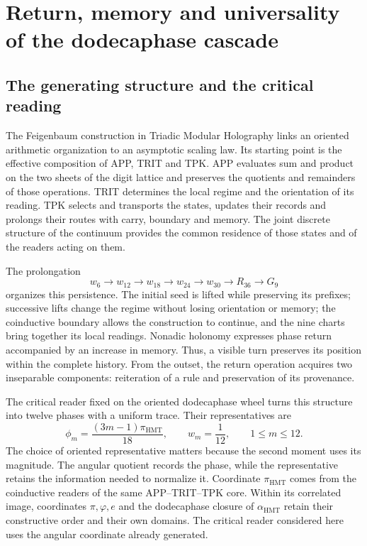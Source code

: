 \section{Return, memory and universality of the dodecaphase cascade}
\label{sec:hmt-feig-interpretacion}

\subsection{The generating structure and the critical reading}

The Feigenbaum construction in Triadic Modular Holography links an
oriented arithmetic organization to an asymptotic scaling law.
Its starting point is the effective composition of APP, TRIT and TPK. APP evaluates
sum and product on the two sheets of the digit lattice and preserves the
quotients and remainders of those operations. TRIT determines the local regime and
the orientation of its reading. TPK selects and transports the states,
updates their records and prolongs their routes with carry, boundary and memory.
The joint discrete structure of the continuum provides the common residence
of those states and of the readers acting on them.

The prolongation
\[
w_6\longrightarrow w_{12}\longrightarrow w_{18}
\longrightarrow w_{24}\longrightarrow w_{30}
\longrightarrow R_{36}\longrightarrow G_9
\]
organizes this persistence. The initial seed is lifted while preserving its
prefixes; successive lifts change the regime without losing orientation
or memory; the coinductive boundary allows the construction to continue, and the
nine charts bring together its local readings. Nonadic holonomy expresses
phase return accompanied by an increase in memory. Thus, a visible
turn preserves its position within the complete history. From the outset,
the return operation acquires two inseparable components:
reiteration of a rule and preservation of its provenance.

The critical reader fixed on the oriented dodecaphase wheel turns this
structure into twelve phases with a uniform trace. Their representatives are
\[
\phi_m=\frac{(3m-1)\pi_{\mathrm{HMT}}}{18},
\qquad w_m=\frac1{12},\qquad 1\le m\le12.
\]
The choice of oriented representative matters because the second moment
uses its magnitude. The angular quotient records the phase, while the
representative retains the information needed to normalize it. Coordinate
\(\pi_{\mathrm{HMT}}\) comes from the coinductive readers of the same
APP--TRIT--TPK core. Within its correlated image, coordinates
\(\pi,\varphi,e\) and the dodecaphase closure of \(\alpha_{\mathrm{HMT}}\)
retain their constructive order and their own domains. The critical reader
considered here uses the angular coordinate already generated.

